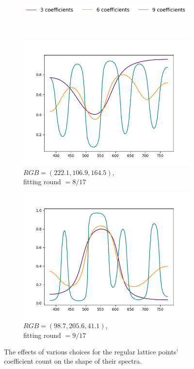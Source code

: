 \begin{figure}[t]
	\centering
	\captionsetup[subfigure]{font=footnotesize,labelfont=footnotesize}
	\captionsetup[subfigure]{justification=centering}
	\begin{subfigure}[t]{0.60\textwidth}
		\includegraphics[width=\linewidth]{img/results_noOfMoments_regularPts_legend.png}
	\end{subfigure} \\
	\begin{subfigure}[t]{0.45\textwidth}
		\includegraphics[width=\linewidth]{img/results_noOfMoments_regularPts_1.png}
		\caption{$RGB=(222.1, 106.9, 164.5)$,\\ fitting round $= 8/17$}
	\end{subfigure}
	\begin{subfigure}[t]{0.45\textwidth}
		\includegraphics[width=\linewidth]{img/results_noOfMoments_regularPts_2.png}
		\caption{$RGB=(98.7, 205.6, 41.1)$,\\ fitting round $= 9/17$}
	\end{subfigure} 
	\caption{The effects of various choices for the regular lattice points' coefficient count on the shape of their spectra.}
	\label{fig:noOfMoments_regularPoints}
\end{figure}


